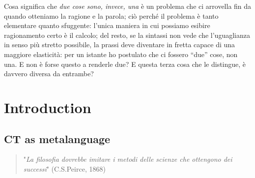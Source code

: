 \documentclass[a4paper, 11pt]{article}
\begin{document}
Cosa significa che \emph{due cose sono, invece, una} è un problema che ci arrovella  fin da quando otteniamo la ragione e la parola; ciò perché il problema è tanto elementare quanto sfuggente: l'unica maniera in cui possiamo esibire ragionamento certo è il calcolo; del resto, se la sintassi non vede che l'uguaglianza in senso più stretto possibile, la prassi deve diventare in fretta capace di una maggiore elasticità: per un istante ho postulato che ci fossero ``due'' cose, non una. E non è forse questo a renderle due? E questa terza cosa che le distingue, è davvero diversa da entrambe?


\section{Introduction}
\subsection{CT as metalanguage}
\begin{quotation}
	\begin{flushright}
		"\textit{La filosofia dovrebbe imitare i metodi delle scienze che ottengono dei successi}" (C.S.Peirce, 1868)
	\end{flushright}
\end{quotation}
\end{document}
